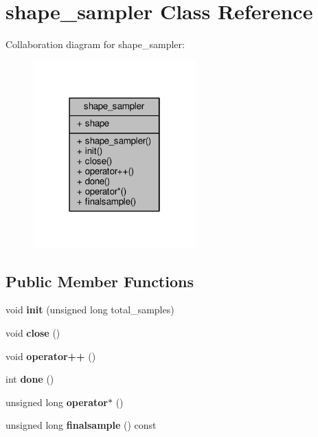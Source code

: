 \hypertarget{classshape__sampler}{}\section{shape\+\_\+sampler Class Reference}
\label{classshape__sampler}


Collaboration diagram for shape\+\_\+sampler\+:
\nopagebreak
\begin{figure}[H]
\begin{center}
\leavevmode
\includegraphics[width=178pt]{d5/d98/classshape__sampler__coll__graph}
\end{center}
\end{figure}
\subsection*{Public Member Functions}
\begin{DoxyCompactItemize}
\item 
void {\bfseries init} (unsigned long total\+\_\+samples)\hypertarget{classshape__sampler_a24754e11fb34794be8228bf874e27d4e}{}\label{classshape__sampler_a24754e11fb34794be8228bf874e27d4e}

\item 
void {\bfseries close} ()\hypertarget{classshape__sampler_ae19c315531113f4d955b2b905bff69aa}{}\label{classshape__sampler_ae19c315531113f4d955b2b905bff69aa}

\item 
void {\bfseries operator++} ()\hypertarget{classshape__sampler_adae40930231184980137a10c5f9bda73}{}\label{classshape__sampler_adae40930231184980137a10c5f9bda73}

\item 
int {\bfseries done} ()\hypertarget{classshape__sampler_ada42c151f4abebded037d059f17207ba}{}\label{classshape__sampler_ada42c151f4abebded037d059f17207ba}

\item 
unsigned long {\bfseries operator$\ast$} ()\hypertarget{classshape__sampler_ad7c6c8c2753120b837efb466e81e893f}{}\label{classshape__sampler_ad7c6c8c2753120b837efb466e81e893f}

\item 
unsigned long {\bfseries finalsample} () const \hypertarget{classshape__sampler_ae7354c3452a0cc1adf6140a46f723a56}{}\label{classshape__sampler_ae7354c3452a0cc1adf6140a46f723a56}

\end{DoxyCompactItemize}
